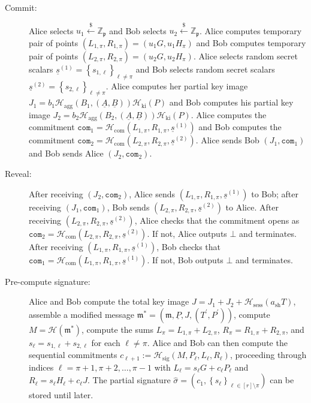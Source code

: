 \documentclass{mrl}
\theoremstyle{definition}
\numberwithin{theorem}{subsection}
\newcommand{\bbz}{\mathbb{Z}}
\newcommand{\p}{\mathfrak{p}}
\newcommand{\m}{\mathfrak{m}}
\begin{document}
\begin{description}
\item [Commit:] Alice selects $u_1 \overset{\$}{\leftarrow} \bbz_\p$ and Bob selects $u_2 \overset{\$}{\leftarrow} \bbz_\p$. Alice computes temporary pair of points $(L_{1, \pi}, R_{1,\pi}) = (u_1 G, u_1 H_\pi)$ and Bob computes temporary pair of points $(L_{2, \pi}, R_{2,\pi}) = (u_2 G, u_2 H_\pi)$. Alice selects random secret scalars $\underline{s}^{(1)} = \left\{s_{1, \ell}\right\}_{\ell \neq \pi}$ and Bob selects random secret scalars $\underline{s}^{(2)} = \left\{s_{2,\ell}\right\}_{\ell \neq \pi}$. Alice computes her partial key image $J_1 = b_1 \mathcal{H}_{\text{agg}}(B_1, (\underline{A}, \underline{B}))\mathcal{H}_{\text{ki}}(P)$ and Bob computes his partial key image $J_2 = b_2 \mathcal{H}_{\text{agg}}(B_2, (\underline{A}, \underline{B}))\mathcal{H}_{\text{ki}}(P)$. Alice computes the commitment $\texttt{com}_1 = \mathcal{H}_{\text{com}}(L_{1,\pi}, R_{1,\pi}, \underline{s}^{(1)})$ and Bob computes the commitment  $\texttt{com}_2 = \mathcal{H}_{\text{com}}(L_{2,\pi}, R_{2,\pi}, \underline{s}^{(2)})$. Alice sends Bob $(J_1, \texttt{com}_1)$ and Bob sends Alice $(J_2,\texttt{com}_2)$.

\item [Reveal:] After receiving $(J_2, \texttt{com}_2)$, Alice sends $(L_{1,\pi}, R_{1,\pi}, \underline{s}^{(1)})$ to Bob; after receiving $(J_1, \texttt{com}_1)$, Bob sends $(L_{2,\pi}, R_{2,\pi}, \underline{s}^{(2)})$ to Alice. After receiving  $(L_{2,\pi}, R_{2,\pi}, \underline{s}^{(2)})$, Alice checks that the commitment opens as $\texttt{com}_2 = \mathcal{H}_{\text{com}}(L_{2,\pi}, R_{2,\pi}, \underline{s}^{(2)})$. If not, Alice outputs $\bot$ and terminates. After receiving $(L_{1,\pi}, R_{1,\pi}, \underline{s}^{(1)})$, Bob checks that $\texttt{com}_1 = \mathcal{H}_{\text{com}}(L_{1,\pi}, R_{1,\pi}, \underline{s}^{(1)})$. If not, Bob outputs $\bot$ and terminates.

\item [Pre-compute signature:] Alice and Bob compute the total key image $J = J_1 + J_2 + \mathcal{H}_{\text{sess}}(a_{\text{sh}}T)$, assemble a modified message $\m^* = (\m, \underline{P}, J, (T^{\prime}, P^{\prime}))$, compute $M = \mathcal{H}(\m^*)$, compute the sums $L_\pi = L_{1,\pi} + L_{2,\pi}$, $R_\pi = R_{1,\pi} + R_{2,\pi}$, and $s_\ell = s_{1,\ell} + s_{2, \ell}$ for each $\ell \neq \pi$. Alice and Bob can then compute the sequential commitments $c_{\ell+1} := \mathcal{H}_{\text{sig}}(M,P_\ell, L_{\ell}, R_{\ell})$, proceeding through indices $\ell=\pi+1, \pi+2, \ldots, \pi-1$ with $L_\ell = s_\ell G + c_\ell P_\ell$ and $R_\ell = s_\ell H_\ell + c_\ell J$.   The partial signature $\widehat{\sigma} = (c_1, \left\{s_\ell\right\}_{\ell \in [r] \setminus \pi})$ can be stored until later.


\end{description}
\end{document}
